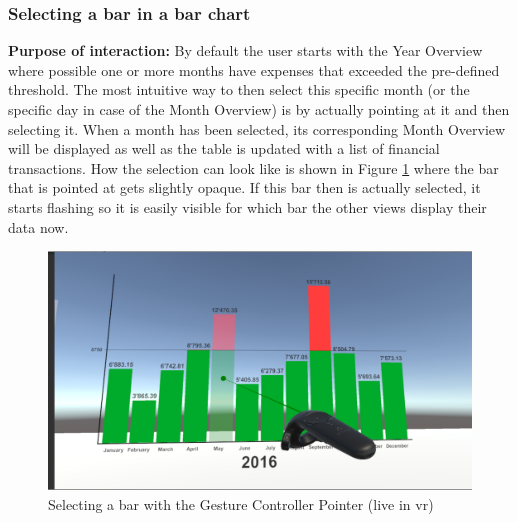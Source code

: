 \subsubsection{Selecting a bar in a bar chart}

\label{SubSubSectionSelectionBar}

\textbf{Purpose of interaction:} By default the user starts with the Year Overview where possible  one or more months have expenses that exceeded the pre-defined threshold. The most intuitive way to then select this specific month (or the specific day in case of the Month Overview) is by actually pointing at it and then selecting it. When a month has been selected, its corresponding Month Overview will be displayed as well as the table is updated with a list of financial transactions. How the selection can look like is shown in Figure \ref{fig:unitybarselection} where the bar that is pointed at gets slightly opaque. If this bar then is actually selected, it starts flashing so it is easily visible for which bar the other views display their data now.
\begin{figure}[h]
	\begin{center}
		\includegraphics[width=12cm]{03_Figures/08_Development/Bar_Selection.png}
		\caption{Selecting a bar with the Gesture Controller Pointer (live in \gls{vr})}
		\label{fig:unitybarselection}
	\end{center}
\end{figure}


